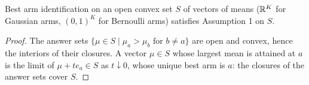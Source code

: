 \begin{lemma}
  \label{lem:isRegular_baiTask}
  \leanok
  Best arm identification on an open convex set $S$ of vectors of means ($\mathbb{R}^K$ for Gaussian arms,
  $(0, 1)^K$ for Bernoulli arms) satisfies Assumption 1 on $S$.
\end{lemma}

\begin{proof}
  \leanok
  The answer sets $\{\mu \in S \mid \mu_a > \mu_b \text{ for } b \ne a\}$ are open and convex,
  hence the interiors of their closures. A vector $\mu \in S$ whose largest mean is attained at $a$
  is the limit of $\mu + t e_a \in S$ as $t \downarrow 0$, whose unique best arm is $a$: the
  closures of the answer sets cover $S$.
\end{proof}
